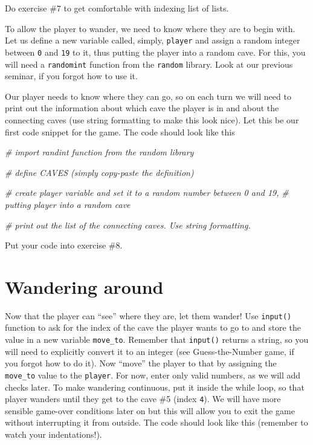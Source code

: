 \documentclass[
]{book}
\newenvironment{Shaded}{\begin{snugshade}}{\end{snugshade}}
\newcommand{\CommentTok}[1]{\textcolor[rgb]{0.56,0.35,0.01}{\textit{#1}}}
\begin{document}
Do exercise \#7 to get comfortable with indexing list of lists.

To allow the player to wander, we need to know where they are to begin with. Let us define a new variable called, simply, \texttt{player} and assign a random integer between \texttt{0} and \texttt{19} to it, thus putting the player into a random cave. For this, you will need a \texttt{randomint} function from the \texttt{random} library. Look at our previous seminar, if you forgot how to use it.

Our player needs to know where they can go, so on each turn we will need to print out the information about which cave the player is in and about the connecting caves (use string formatting to make this look nice). Let this be our first code snippet for the game. The code should look like this

\begin{Shaded}
\begin{Highlighting}[]
\CommentTok{\# import randint function from the random library}

\CommentTok{\# define CAVES (simply copy{-}paste the definition)}

\CommentTok{\# create \textasciigrave{}player\textasciigrave{} variable and set it to a random number between 0 and 19, }
\CommentTok{\# putting player into a random cave}

\CommentTok{\# print out the list of the connecting caves. Use string formatting.}
\end{Highlighting}
\end{Shaded}

Put your code into exercise \#8.

\hypertarget{wandering-around}{%
\section{Wandering around}\label{wandering-around}}

Now that the player can ``see'' where they are, let them wander! Use \texttt{input()} function to ask for the index of the cave the player wants to go to and store the value in a new variable \texttt{move\_to}. Remember that \texttt{input()} returns a string, so you will need to explicitly convert it to an integer (see Guess-the-Number game, if you forgot how to do it). Now ``move'' the player to that by assigning the \texttt{move\_to} value to the \texttt{player}. For now, enter only valid numbers, as we will add checks later. To make wandering continuous, put it inside the while loop, so that player wanders until they get to the cave \#5 (index \texttt{4}). We will have more sensible game-over conditions later on but this will allow you to exit the game without interrupting it from outside. The code should look like this (remember to watch your indentations!).
\end{document}
